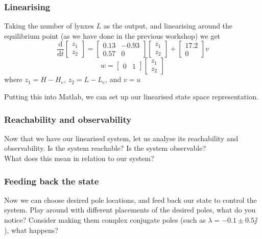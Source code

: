 \documentclass[9pt]{beamer-control}
\begin{document}
\begin{frame}
\frametitle{Linearising}
Taking the number of lynxes $L$ as the output, and linearising around the equilibrium point (as we have done in the previous workshop) we get
\begin{equation}\frac{\mathrm{d}}{\mathrm{d}t}\begin{bmatrix}
	z_1 \\ z_2
\end{bmatrix} = \begin{bmatrix}
	0.13 & -0.93 \\ 0.57 & 0
\end{bmatrix} \begin{bmatrix}
	z_1 \\ z_2
\end{bmatrix}  + \begin{bmatrix}
	17.2 \\ 0
\end{bmatrix} v\end{equation}
\begin{equation}w=\begin{bmatrix}
	0& 1
\end{bmatrix}  \begin{bmatrix}
	z_1 \\ z_2
\end{bmatrix} \end{equation}
where $z_1=H-H_e$, $z_2=L-L_e$, and $v=u$

Putting this into Matlab, we can set up our linearised state space representation.
\end{frame}

\begin{frame}
	\frametitle{Reachability and observability}
	Now that we have our linearised system, let us analyse its reachability and observability.
	Is the system reachable?
	Is the system observable?\\[15pt]
	What does this mean in relation to our system?
\end{frame}

\begin{frame}
	\frametitle{Feeding back the state}
Now we can choose desired pole locations, and feed back our state to control the system.
Play around with different placements of the desired poles, what do you notice? Consider making them complex conjugate poles (such as $\lambda = -0.1\pm 0.5\jj$), what happens?
\end{frame}
\end{document}
